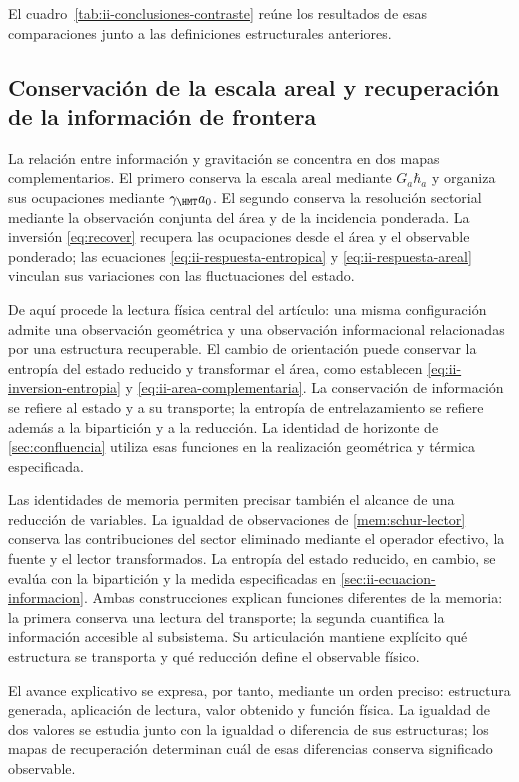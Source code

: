 El cuadro~\ref{tab:ii-conclusiones-contraste} reúne los resultados de
esas comparaciones junto a las definiciones estructurales anteriores.


\subsection{Conservación de la escala areal y recuperación de la información de frontera}

La relación entre información y gravitación se concentra en dos mapas
complementarios. El primero conserva la escala areal mediante
$G_a\hbar_a$ y organiza sus ocupaciones mediante
$\gamma_{\HMT}a_0$. El segundo conserva la resolución sectorial mediante
la observación conjunta del área y de la incidencia ponderada. La inversión
\eqref{eq:recover} recupera las ocupaciones desde el área y el
observable ponderado; las ecuaciones
\eqref{eq:ii-respuesta-entropica} y \eqref{eq:ii-respuesta-areal}
vinculan sus variaciones con las fluctuaciones del estado.

De aquí procede la lectura física central del artículo: una misma
configuración admite una observación geométrica y una observación
informacional relacionadas por una estructura recuperable. El cambio
de orientación puede conservar la entropía del estado reducido y
transformar el área, como establecen
\eqref{eq:ii-inversion-entropia} y \eqref{eq:ii-area-complementaria}.
La conservación de información se refiere al estado y a su transporte;
la entropía de entrelazamiento se refiere además a la bipartición y a
la reducción. La identidad de horizonte de
\ref{sec:confluencia} utiliza esas funciones en la realización
geométrica y térmica especificada.

Las identidades de memoria permiten precisar también el alcance de una
reducción de variables. La igualdad de observaciones de
\eqref{mem:schur-lector} conserva las contribuciones del sector eliminado
mediante el operador efectivo, la fuente y el lector transformados.
La entropía del estado reducido, en cambio, se evalúa con la bipartición
y la medida especificadas en \ref{sec:ii-ecuacion-informacion}.
Ambas construcciones explican funciones diferentes de la memoria:
la primera conserva una lectura del transporte; la segunda cuantifica
la información accesible al subsistema. Su articulación mantiene
explícito qué estructura se transporta y qué reducción define el
observable físico.

El avance explicativo se expresa, por tanto, mediante un orden preciso:
estructura generada, aplicación de lectura, valor obtenido y función
física. La igualdad de dos valores se estudia junto con la igualdad
o diferencia de sus estructuras; los mapas de recuperación determinan
cuál de esas diferencias conserva significado observable.
